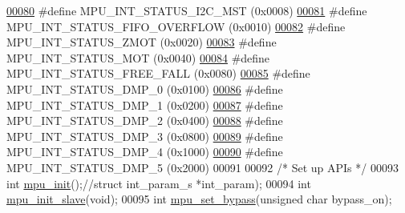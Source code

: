 \begin{DoxyCode}
\hypertarget{inv__mpu_8h_source.tex_l00080}{}\hyperlink{group___d_r_i_v_e_r_s_ga5755e84f3a2e7d331f7612dbfea18ecc}{00080} \textcolor{preprocessor}{#define MPU\_INT\_STATUS\_I2C\_MST          (0x0008)}
\hypertarget{inv__mpu_8h_source.tex_l00081}{}\hyperlink{group___d_r_i_v_e_r_s_gaf8e1684698ad837d0318a72b1ef73b13}{00081} \textcolor{preprocessor}{#define MPU\_INT\_STATUS\_FIFO\_OVERFLOW    (0x0010)}
\hypertarget{inv__mpu_8h_source.tex_l00082}{}\hyperlink{group___d_r_i_v_e_r_s_gad5eee7ff393f842ca4ae969cc0019030}{00082} \textcolor{preprocessor}{#define MPU\_INT\_STATUS\_ZMOT             (0x0020)}
\hypertarget{inv__mpu_8h_source.tex_l00083}{}\hyperlink{group___d_r_i_v_e_r_s_gaa1ab51fb5995e568edd425f8486cb2c8}{00083} \textcolor{preprocessor}{#define MPU\_INT\_STATUS\_MOT              (0x0040)}
\hypertarget{inv__mpu_8h_source.tex_l00084}{}\hyperlink{group___d_r_i_v_e_r_s_ga000cfa5230cb895c6bad322856465552}{00084} \textcolor{preprocessor}{#define MPU\_INT\_STATUS\_FREE\_FALL        (0x0080)}
\hypertarget{inv__mpu_8h_source.tex_l00085}{}\hyperlink{group___d_r_i_v_e_r_s_ga2398e82f93220e3cfa1ef31bfb6d76bd}{00085} \textcolor{preprocessor}{#define MPU\_INT\_STATUS\_DMP\_0            (0x0100)}
\hypertarget{inv__mpu_8h_source.tex_l00086}{}\hyperlink{group___d_r_i_v_e_r_s_ga5ac2e94db5083456fa531fceee0997f5}{00086} \textcolor{preprocessor}{#define MPU\_INT\_STATUS\_DMP\_1            (0x0200)}
\hypertarget{inv__mpu_8h_source.tex_l00087}{}\hyperlink{group___d_r_i_v_e_r_s_gab7543433b9679174597e00e5d7cb6279}{00087} \textcolor{preprocessor}{#define MPU\_INT\_STATUS\_DMP\_2            (0x0400)}
\hypertarget{inv__mpu_8h_source.tex_l00088}{}\hyperlink{group___d_r_i_v_e_r_s_gaea5cac4528bb19757de4eb4fa46a374f}{00088} \textcolor{preprocessor}{#define MPU\_INT\_STATUS\_DMP\_3            (0x0800)}
\hypertarget{inv__mpu_8h_source.tex_l00089}{}\hyperlink{group___d_r_i_v_e_r_s_ga4345dc987e1b65ef8ddc6160f592e144}{00089} \textcolor{preprocessor}{#define MPU\_INT\_STATUS\_DMP\_4            (0x1000)}
\hypertarget{inv__mpu_8h_source.tex_l00090}{}\hyperlink{group___d_r_i_v_e_r_s_ga101643480b83c302a4a3089fe9149e8e}{00090} \textcolor{preprocessor}{#define MPU\_INT\_STATUS\_DMP\_5            (0x2000)}
00091 
00092 \textcolor{comment}{/* Set up APIs */}
00093 \textcolor{keywordtype}{int} \hyperlink{group___d_r_i_v_e_r_s_ga63637cf3771995aeda99d91d5f345f29}{mpu\_init}();\textcolor{comment}{//struct int\_param\_s *int\_param);}
00094 \textcolor{keywordtype}{int} \hyperlink{group___d_r_i_v_e_r_s_ga9093183fe619360b3b1bfb8aab030592}{mpu\_init\_slave}(\textcolor{keywordtype}{void});
00095 \textcolor{keywordtype}{int} \hyperlink{group___d_r_i_v_e_r_s_ga36f70f38371b48d81094d3b061233e15}{mpu\_set\_bypass}(\textcolor{keywordtype}{unsigned} \textcolor{keywordtype}{char} bypass\_on);

\end{DoxyCode}
